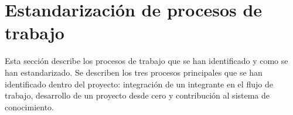 \section{Estandarización de procesos de trabajo}
Esta sección describe los procesos de trabajo que se
han identificado y como se han estandarizado. Se describen
los tres procesos principales que se han identificado dentro
del proyecto: integración de un integrante en el flujo de trabajo,
desarrollo de un proyecto desde cero y contribución al sistema
de conocimiento.





\pagebreak
